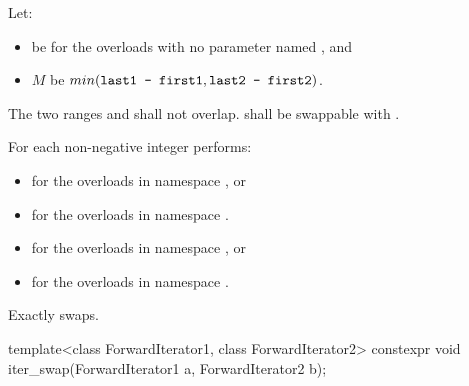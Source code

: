 \begin{itemdescr}
\begin{addedblock}
\pnum
Let:
\begin{itemize}
\item {} be  for the overloads with
  no parameter named , and
\item $M$ be $min(\texttt{last1 - first1}, \texttt{last2 - first2})$.
\end{itemize}
\end{addedblock}

\pnum
\requires
The two ranges 
and
shall not overlap. 
 shall be swappable with
.

\pnum
\effects
For each non-negative integer
performs: 
\begin{addedblock}
\begin{itemize}
\item {} for the overloads in
  namespace , or
\item {} for the overloads
  in namespace .
\end{itemize}
\end{addedblock}

\pnum
\returns {}
\begin{addedblock}
\begin{itemize}
\item {} for the overloads in namespace , or
\item {}
  for the overloads in namespace .
\end{itemize}
\end{addedblock}

\pnum
\complexity
Exactly
swaps.
\end{itemdescr}


%
\begin{itemdecl}
template<class ForwardIterator1, class ForwardIterator2>
  constexpr void iter_swap(ForwardIterator1 a, ForwardIterator2 b);
\end{itemdecl}


